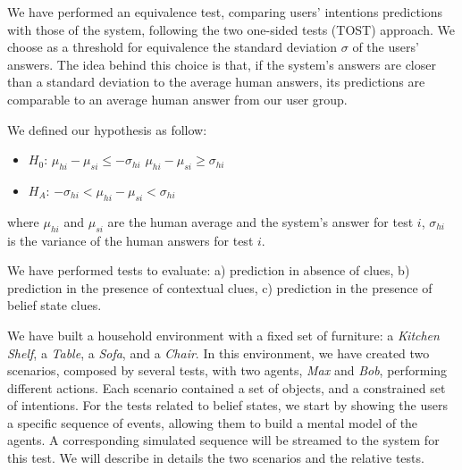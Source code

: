 We have performed an equivalence test, comparing users' intentions predictions with those of the system, following the two one-sided tests (TOST) approach. We choose as a threshold for equivalence the standard deviation $\sigma$ of the users' answers. The idea behind this choice is that, if the system's answers are closer than a standard deviation to the average human answers, its predictions are comparable to an average human answer from our user group. 

We defined our hypothesis as follow: 
\begin{itemize}
\item $H_0$: $\mu_{hi}-\mu_{si}\leq-\sigma_{hi}$ \;  \; $\mu_{hi}-\mu_{si}\geq\sigma_{hi}$ 
\item $H_A$: $-\sigma_{hi}<\mu_{hi}-\mu_{si}<\sigma_{hi}$  
\end{itemize}
where $\mu_{hi}$ and $\mu_{si}$ are the human average and the system's answer for test $i$, $\sigma_{hi}$ is the variance of the human answers for test $i$.

We have performed tests to evaluate: a) prediction in absence of clues, b) prediction in the presence of contextual clues, c) prediction in the presence of belief state clues.

We have built a household environment with a fixed set of furniture: a \textit{Kitchen Shelf}, a \textit{Table}, a \textit{Sofa}, and a \textit{Chair}. In this environment, we have created two scenarios, composed by several tests, with two agents, \textit{Max} and \textit{Bob}, performing different actions. Each scenario contained a set of objects, and a constrained set of intentions. For the tests related to belief states, we start by showing the users a specific sequence of events, allowing them to build a mental model of the agents. A corresponding simulated sequence will be streamed to the system for this test.
We will describe in details the two scenarios and the relative tests.

